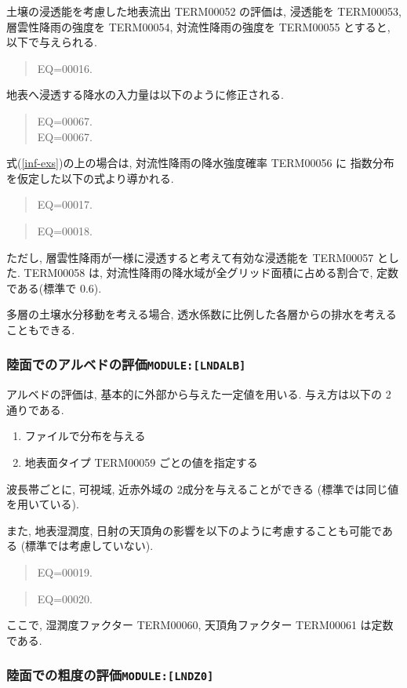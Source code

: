 土壌の浸透能を考慮した地表流出 TERM00052 の評価は, 浸透能を TERM00053, 
層雲性降雨の強度を TERM00054, 対流性降雨の強度を TERM00055 とすると, 
以下で与えられる. 
\begin{quote}
EQ=00016.
\label{inf-exs}
\end{quote}
地表へ浸透する降水の入力量は以下のように修正される. 
\begin{quote}
EQ=00067.\\
EQ=00067.
\end{quote}
式(\ref{inf-exs})の上の場合は, 対流性降雨の降水強度確率 TERM00056 に
指数分布を仮定した以下の式より導かれる. 
\begin{quote}
EQ=00017.
\end{quote}
\begin{quote}
EQ=00018.
\end{quote}
ただし, 層雲性降雨が一様に浸透すると考えて有効な浸透能を
TERM00057 とした. 
TERM00058 は, 対流性降雨の降水域が全グリッド面積に占める割合で, 
定数である(標準で 0.6). 

多層の土壌水分移動を考える場合, 
透水係数に比例した各層からの排水を考えることもできる. 

\subsubsection{陸面でのアルベドの評価\texttt{MODULE:[LNDALB]}}

アルベドの評価は, 基本的に外部から与えた一定値を用いる. 
与え方は以下の 2通りである. 
\begin{enumerate}
    \item ファイルで分布を与える
    \item 地表面タイプ TERM00059 ごとの値を指定する
\end{enumerate}

波長帯ごとに, 可視域, 近赤外域の 2成分を与えることができる
(標準では同じ値を用いている). 

また, 地表湿潤度, 日射の天頂角の影響を以下のように考慮することも可能である
(標準では考慮していない). 
\begin{quote}
EQ=00019.
\end{quote}
\begin{quote}
EQ=00020.
\end{quote}
ここで, 湿潤度ファクター TERM00060, 天頂角ファクター TERM00061 は定数である. 

\subsubsection{陸面での粗度の評価\texttt{MODULE:[LNDZ0]}}

